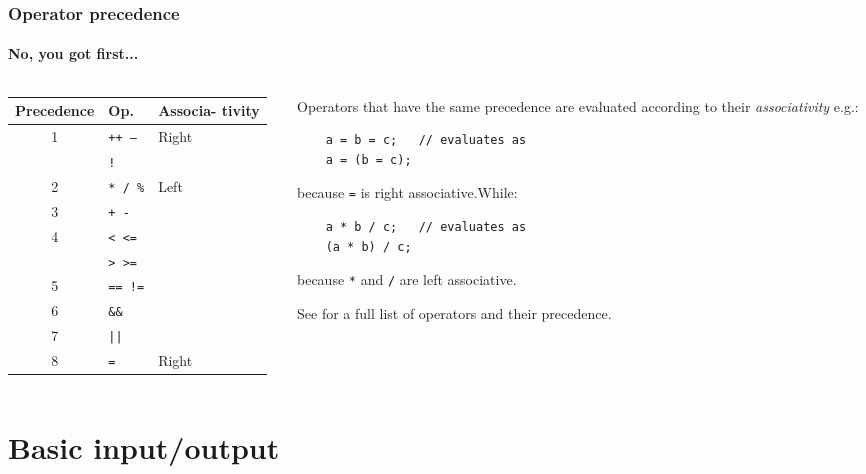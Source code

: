 \documentclass{beamer}
\begin{document}
\begin{frame}[fragile]
  \frametitle{Operator precedence}
  \framesubtitle{No, you got first...}
  \begin{columns}[t]
	  \begin{column}[T]{0.44\textwidth}
		  \begin{tabular}{c|l|m{1.2cm}}
			  Precedence & Op. & Associa-
			  tivity \\
			  \hline
			  \multirow{2}{*}{1} & \texttt{++ --} & \multirow{2}{*}{Right}\\
			    & \texttt{!} \\
			  \hline
			  2 & \texttt{* / \%} & \multirow{6}{*}{Left} \\
			  \cline{1-2}
			  3 & \texttt{+ -} & \\
			  \cline{1-2}
			  \multirow{2}{*}{4} & \texttt{< <=} \\
			    & \texttt{> >=} \\
			  \cline{1-2}
			  5 & \texttt{== !=} \\
			  \cline{1-2}
			  6 & \texttt{\&\&} \\
			  \cline{1-2}
			  7 & \texttt{||} \\
			  \hline
			  8 & \texttt{=} & Right
		  \end{tabular}
	 	\end{column}
	  \begin{column}[T]{0.518\textwidth}
	    Operators that have the same precedence are evaluated according to their \textit{associativity} e.g.:
	    \begin{lstlisting}
	a = b = c;   // evaluates as
	a = (b = c);
	    \end{lstlisting}
			because \texttt{=} is right associative.\pause  While:
	    \begin{lstlisting}
	a * b / c;   // evaluates as
	(a * b) / c;
	    \end{lstlisting}
	because \texttt{*} and \texttt{/} are left associative. 
	    
	  	See\footnotemark{} for a full list of operators and their precedence.
	  \end{column}
	\end{columns}
\end{frame}


\section{Basic input/output}
\end{document}
